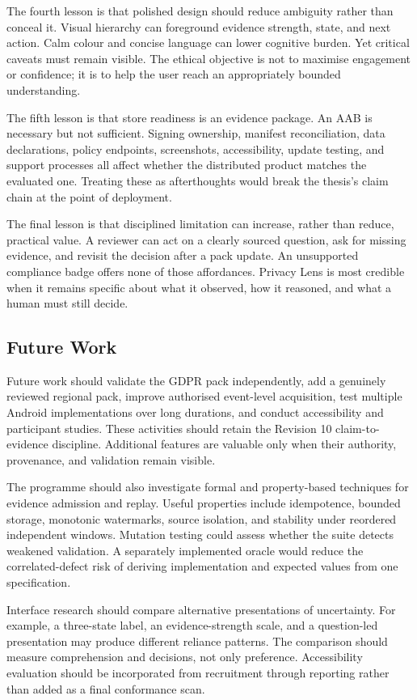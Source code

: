 The fourth lesson is that polished design should reduce ambiguity rather than conceal it. Visual hierarchy can foreground evidence strength, state, and next action. Calm colour and concise language can lower cognitive burden. Yet critical caveats must remain visible. The ethical objective is not to maximise engagement or confidence; it is to help the user reach an appropriately bounded understanding.

The fifth lesson is that store readiness is an evidence package. An AAB is necessary but not sufficient. Signing ownership, manifest reconciliation, data declarations, policy endpoints, screenshots, accessibility, update testing, and support processes all affect whether the distributed product matches the evaluated one. Treating these as afterthoughts would break the thesis's claim chain at the point of deployment.

The final lesson is that disciplined limitation can increase, rather than reduce, practical value. A reviewer can act on a clearly sourced question, ask for missing evidence, and revisit the decision after a pack update. An unsupported compliance badge offers none of those affordances. Privacy Lens is most credible when it remains specific about what it observed, how it reasoned, and what a human must still decide.

\subsection{Future Work}

Future work should validate the GDPR pack independently, add a genuinely reviewed regional pack, improve authorised event-level acquisition, test multiple Android implementations over long durations, and conduct accessibility and participant studies. These activities should retain the Revision 10 claim-to-evidence discipline. Additional features are valuable only when their authority, provenance, and validation remain visible.

The programme should also investigate formal and property-based techniques for evidence admission and replay. Useful properties include idempotence, bounded storage, monotonic watermarks, source isolation, and stability under reordered independent windows. Mutation testing could assess whether the suite detects weakened validation. A separately implemented oracle would reduce the correlated-defect risk of deriving implementation and expected values from one specification.

Interface research should compare alternative presentations of uncertainty. For example, a three-state label, an evidence-strength scale, and a question-led presentation may produce different reliance patterns. The comparison should measure comprehension and decisions, not only preference. Accessibility evaluation should be incorporated from recruitment through reporting rather than added as a final conformance scan.

